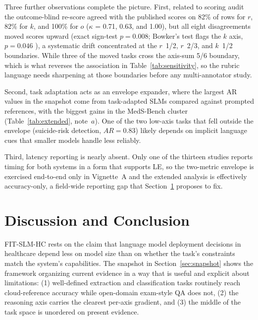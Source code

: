 \documentclass[11pt]{article}
\begin{document}
Three further observations complete the picture. First, related to scoring audit the outcome-blind re-score agreed with the published scores on 82\% of rows for $r$, 82\% for $k$, and 100\% for $o$ ($\kappa$ = 0.71, 0.63, and 1.00), but all eight disagreements moved scores upward (exact sign-test $p = 0.008$; Bowker's test flags the $k$ axis, $p = 0.046$ \cite{Bowker1948}), a systematic drift concentrated at the $r$~1/2, $r$~2/3, and $k$~1/2 boundaries. While three of the moved tasks cross the axis-sum 5/6 boundary, which is what reverses the association in Table~\ref{tab:sensitivity}, so the rubric language needs sharpening at those boundaries before any multi-annotator study.

Second, task adaptation acts as an envelope expander, where the largest AR values in the snapshot come from task-adapted SLMs compared against prompted references, with the biggest gains in the MedS-Bench cluster (Table~\ref{tab:extended}, note~$a$). One of the two low-axis tasks that fell outside the envelope (suicide-risk detection, $AR = 0.83$) likely depends on implicit language cues that smaller models handle less reliably.

Third, latency reporting is nearly absent. Only one of the thirteen studies reports timing for both systems in a form that supports LE, so the two-metric envelope is exercised end-to-end only in Vignette~A and the extended analysis is effectively accuracy-only, a field-wide reporting gap that Section~\ref{sec:discussion} proposes to fix.

\section{Discussion and Conclusion}
\label{sec:discussion}

FIT-SLM-HC rests on the claim that language model deployment decisions in healthcare depend less on model size than on whether the task's constraints match the system's capabilities. The snapshot in Section~\ref{sec:snapshot} shows the framework organizing current evidence in a way that is useful and explicit about limitations: (1) well-defined extraction and classification tasks routinely reach cloud-reference accuracy while open-domain exam-style QA does not, (2) the reasoning axis carries the clearest per-axis gradient, and (3) the middle of the task space is unordered on present evidence.
\end{document}
